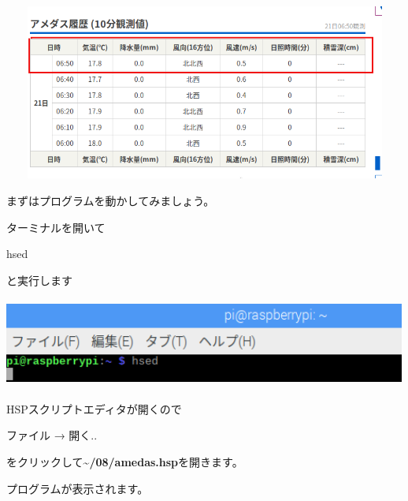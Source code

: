 \documentclass[a4paper,12pt,dvipdfmx]{jarticle}
\begin{document}
\begin{center}
\includegraphics[width=17.006cm,height=5.777cm]{textbook-img029-1.png}

\end{center}

\bigskip

\clearpage
まずはプログラムを動かしてみましょう。

ターミナルを開いて

hsed

と実行します



\begin{center}
\includegraphics[width=13.28cm,height=2.933cm]{textbook-img013.png}

\end{center}

\bigskip


\bigskip


\bigskip

HSPスクリプトエディタが開くので

ファイル → 開く.. 

をクリックして\textbf{\~{}/08/amedas.hsp}を開きます。

プログラムが表示されます。
\end{document}
